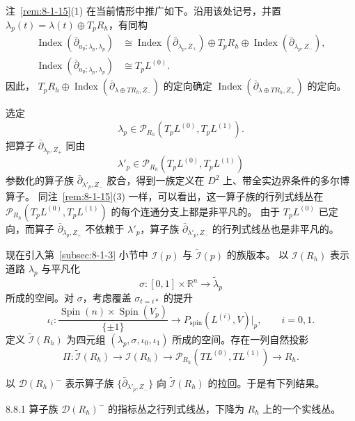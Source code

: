 注~\ref{rem:8-1-15}(1) 在当前情形中推广如下。沿用该处记号，并置
$\lambda_p(t)=\lambda(t)\oplus T_pR_h$，有同构
\[
\begin{aligned}
 \operatorname{Index}
 (\bar\partial_{u_p;\lambda_p,\lambda_p})
 &\cong
 \operatorname{Index}(\bar\partial_{\lambda_p,Z_+})
 \oplus T_pR_h
 \oplus
 \operatorname{Index}(\bar\partial_{\lambda_p,Z_-}),\\
 \operatorname{Index}
 (\bar\partial_{u_p;\lambda_p,\lambda_p})
 &\cong T_pL^{(0)}.
\end{aligned}
\]
因此，
$T_pR_h\oplus
\operatorname{Index}(\bar\partial_{\lambda\oplus TR_h,Z_-})$
的定向确定
$\operatorname{Index}(\bar\partial_{\lambda\oplus TR_h,Z_+})$
的定向。

选定
\[
 \lambda_p\in
 \mathcal P_{R_h}(T_pL^{(0)},T_pL^{(1)}).
\]
把算子 $\bar\partial_{\lambda_p,Z_+}$ 同由
\[
 \lambda'_p\in
 \mathcal P_{R_h}(T_pL^{(0)},T_pL^{(1)})
\]
参数化的算子族 $\bar\partial_{\lambda'_p,Z_-}$ 胶合，得到一族定义在
$D^2$ 上、带全实边界条件的多尔博算子。%
同注~\ref{rem:8-1-15}(3) 一样，可以看出，这一算子族的行列式线丛在
$\mathcal P_{R_h}(T_pL^{(0)},T_pL^{(1)})$ 的每个连通分支上都是非平凡的。
由于 $T_pL^{(0)}$ 已定向，而算子
$\bar\partial_{\lambda_p,Z_+}$ 不依赖于 $\lambda'_p$，算子族
$\bar\partial_{\lambda'_p,Z_-}$ 的行列式线丛也是非平凡的。

现在引入第~\ref{subsec:8-1-3} 小节中
$\mathcal I(p)$ 与 $\widetilde{\mathcal I}(p)$ 的族版本。
以 $\mathcal I(R_h)$ 表示道路 $\lambda_p$ 与平凡化
\[
 \sigma\colon[0,1]\times\mathbb R^n
 \longrightarrow\widetilde\lambda_p
\]
所成的空间。对 $\sigma$，考虑覆盖 $\sigma_{t=i*}$ 的提升
\[
 \iota_i\colon
 \frac{\operatorname{Spin}(n)\times\operatorname{Spin}(V_p)}
 {\{\pm1\}}
 \longrightarrow
 P_{\mathrm{spin}}(L^{(i)},V)|_p,
 \qquad i=0,1.
\]
定义 $\widetilde{\mathcal I}(R_h)$ 为四元组
$(\lambda_p,\sigma,\iota_0,\iota_1)$ 所成的空间。存在一列自然投影
\[
 \Pi\colon
 \widetilde{\mathcal I}(R_h)
 \longrightarrow\mathcal I(R_h)
 \longrightarrow\mathcal P_{R_h}(TL^{(0)},TL^{(1)})
 \longrightarrow R_h.
\]

以 $\mathcal D(R_h)^-$ 表示算子族
$\{\bar\partial_{\lambda'_p,Z_-}\}$ 向
$\widetilde{\mathcal I}(R_h)$ 的拉回。于是有下列结果。

\begin{proposition}{8.8.1}\label{prop:8-8-1}
算子族 $\mathcal D(R_h)^-$ 的指标丛之行列式线丛，下降为
$R_h$ 上的一个实线丛。
\end{proposition}

